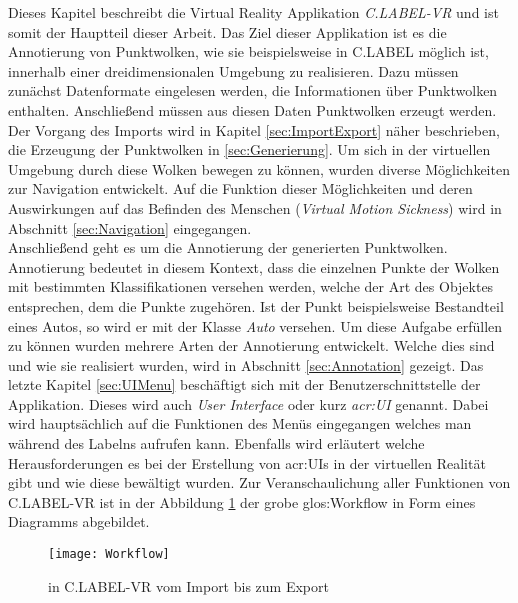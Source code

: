 \graphicspath{{Kapitel/Kapitel4_Hauptteil/Images/}}

Dieses Kapitel beschreibt die Virtual Reality Applikation \textit{C.LABEL-VR} und ist somit der Hauptteil dieser Arbeit. Das Ziel dieser Applikation ist es die Annotierung von Punktwolken, wie sie beispielsweise in C.LABEL möglich ist, innerhalb einer dreidimensionalen Umgebung zu realisieren. Dazu müssen zunächst Datenformate eingelesen werden, die Informationen über Punktwolken enthalten. Anschließend müssen aus diesen Daten Punktwolken erzeugt werden. Der Vorgang des Imports wird in Kapitel \ref{sec:ImportExport} näher beschrieben, die Erzeugung der Punktwolken in \ref{sec:Generierung}. Um sich in der virtuellen Umgebung durch diese Wolken bewegen zu können, wurden diverse Möglichkeiten zur Navigation entwickelt. Auf die Funktion dieser Möglichkeiten und deren Auswirkungen auf das Befinden des Menschen (\textit{Virtual Motion Sickness}) wird in Abschnitt \ref{sec:Navigation} eingegangen.\\

Anschließend geht es um die Annotierung der generierten Punktwolken. Annotierung bedeutet in diesem Kontext, dass die einzelnen Punkte der Wolken mit bestimmten Klassifikationen versehen werden, welche der Art des Objektes entsprechen, dem die Punkte zugehören. Ist der Punkt beispielsweise Bestandteil eines Autos, so wird er mit der Klasse \textit{Auto} versehen. Um diese Aufgabe erfüllen zu können wurden mehrere Arten der Annotierung entwickelt. Welche dies sind und wie sie realisiert wurden, wird in Abschnitt \ref{sec:Annotation} gezeigt. Das letzte Kapitel \ref{sec:UIMenu} beschäftigt sich mit der Benutzerschnittstelle der Applikation. Dieses wird auch \textit{User Interface} oder kurz \textit{\acrshort{acr:UI}} genannt. Dabei wird hauptsächlich auf die Funktionen des Menüs eingegangen welches man während des Labelns aufrufen kann. Ebenfalls wird erläutert welche Herausforderungen es bei der Erstellung von \acrshort{acr:UI}s in der virtuellen Realität gibt und wie diese bewältigt wurden. Zur Veranschaulichung aller Funktionen von C.LABEL-VR ist in der Abbildung \ref{fig:Workflow} der grobe \gls{glos:Workflow} in Form eines Diagramms abgebildet.

\begin{figure}%
	\centering
    \texttt{[image: Workflow]}
    \caption{ in C.LABEL-VR vom Import bis zum Export}
    \label{fig:Workflow}
\end{figure}


